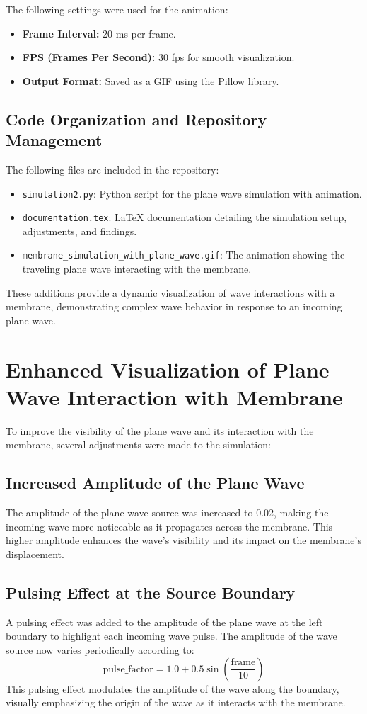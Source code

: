 \documentclass{article}
\begin{document}
The following settings were used for the animation:
\begin{itemize}
    \item \textbf{Frame Interval:} 20 ms per frame.
    \item \textbf{FPS (Frames Per Second):} 30 fps for smooth visualization.
    \item \textbf{Output Format:} Saved as a GIF using the Pillow library.
\end{itemize}

\subsection{Code Organization and Repository Management}
The following files are included in the repository:
\begin{itemize}
    \item \texttt{simulation2.py}: Python script for the plane wave simulation with animation.
    \item \texttt{documentation.tex}: LaTeX documentation detailing the simulation setup, adjustments, and findings.
    \item \texttt{membrane\_simulation\_with\_plane\_wave.gif}: The animation showing the traveling plane wave interacting with the membrane.
\end{itemize}

These additions provide a dynamic visualization of wave interactions with a membrane, demonstrating complex wave behavior in response to an incoming plane wave.

\section{Enhanced Visualization of Plane Wave Interaction with Membrane}

To improve the visibility of the plane wave and its interaction with the membrane, several adjustments were made to the simulation:

\subsection{Increased Amplitude of the Plane Wave}
The amplitude of the plane wave source was increased to 0.02, making the incoming wave more noticeable as it propagates across the membrane. This higher amplitude enhances the wave's visibility and its impact on the membrane’s displacement.

\subsection{Pulsing Effect at the Source Boundary}
A pulsing effect was added to the amplitude of the plane wave at the left boundary to highlight each incoming wave pulse. The amplitude of the wave source now varies periodically according to:
\[
\text{pulse\_factor} = 1.0 + 0.5 \sin\left(\frac{\text{frame}}{10}\right)
\]
This pulsing effect modulates the amplitude of the wave along the boundary, visually emphasizing the origin of the wave as it interacts with the membrane.
\end{document}
